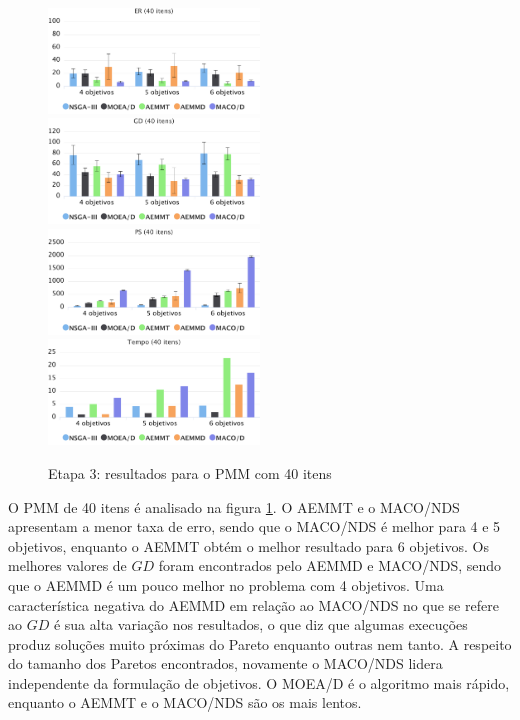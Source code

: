 \begin{figure}[!htbp]
	\caption{Etapa 3: resultados para o PMM com 40 itens}
	\label{fig_exp3_pmm_40}
	\includegraphics[width=0.5\textwidth]{cap_experimentos/figs/etapa3/er-mkp-40}
	\includegraphics[width=0.5\textwidth]{cap_experimentos/figs/etapa3/gd-mkp-40}
	\includegraphics[width=0.5\textwidth]{cap_experimentos/figs/etapa3/ps-mkp-40}
	\includegraphics[width=0.5\textwidth]{cap_experimentos/figs/etapa3/time-mkp-40}
\end{figure}

O PMM de 40 itens é analisado na figura \ref{fig_exp3_pmm_40}. O AEMMT e o MACO/NDS apresentam a menor taxa de erro, sendo que o MACO/NDS é melhor para 4 e 5 objetivos, enquanto o AEMMT obtém o melhor resultado para 6 objetivos. Os melhores valores de $GD$ foram encontrados pelo AEMMD e MACO/NDS, sendo que o AEMMD é um pouco melhor no problema com 4 objetivos. Uma característica negativa do AEMMD em relação ao MACO/NDS no que se refere ao $GD$ é sua alta variação nos resultados, o que diz que algumas execuções produz soluções muito próximas do Pareto enquanto outras nem tanto. A respeito do tamanho dos Paretos encontrados, novamente o MACO/NDS lidera independente da formulação de objetivos. O MOEA/D é o algoritmo mais rápido, enquanto o AEMMT e o MACO/NDS são os mais lentos.

